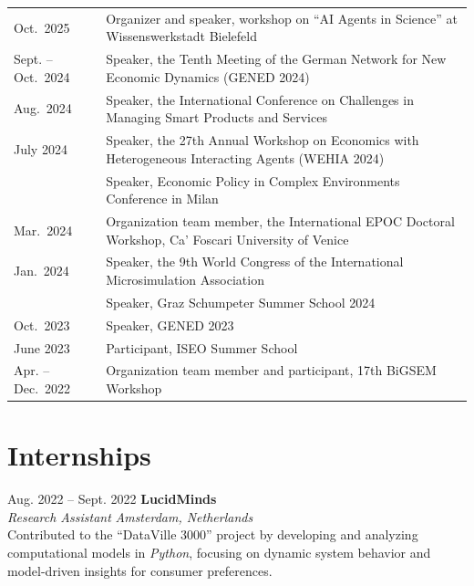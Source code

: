 \documentclass[a4paper,12pt]{article}
\makeatletter
\newenvironment{jobshort}[2]
    {
    \begin{tabularx}{\linewidth}{@{}l X r@{}}
    \textbf{#1} & \hfill &  #2 \\[3.75pt]
    \end{tabularx}
    }
    {
    }
\makeatother
\begin{document}
\begin{tabularx}{\linewidth}{@{}l X@{}}

Oct.\ 2025 & Organizer and speaker, workshop on “AI Agents in Science” at Wissenswerkstadt Bielefeld \\

Sept. -- Oct.\ 2024 & Speaker, the Tenth Meeting of the German Network for New Economic Dynamics (GENED 2024) \\

Aug.\ 2024 & Speaker, the International Conference on Challenges in Managing Smart Products and Services \\

July 2024 & Speaker, the 27th Annual Workshop on Economics with Heterogeneous Interacting Agents (WEHIA 2024) \\
& Speaker, Economic Policy in Complex Environments Conference in Milan \\

Mar.\ 2024 & Organization team member, the International EPOC Doctoral Workshop, Ca’ Foscari University of Venice \\

Jan.\ 2024 & Speaker, the 9th World Congress of the International Microsimulation Association \\

 & Speaker, Graz Schumpeter Summer School 2024 \\

Oct.\ 2023 & Speaker, GENED 2023 \\

June 2023 & Participant, ISEO Summer School \\

Apr. -- Dec.\ 2022 & Organization team member and participant, 17th BiGSEM Workshop \\

\end{tabularx}


\section{Internships}

Aug. 2022 -- Sept. 2022 \hfill \textbf{LucidMinds} \\ %
\textit{Research Assistant} \hfill \textit{Amsterdam, Netherlands} \\
\textbullet Contributed to the “DataVille 3000” project by developing and analyzing computational models in \textit{Python}, focusing on dynamic system behavior and model-driven insights for consumer preferences.
\end{document}
